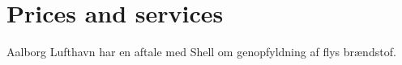 \section{Prices and services}

Aalborg Lufthavn har en aftale med Shell om genopfyldning af flys brændstof.

